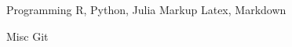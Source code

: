 

\begin{cvskills}

  \cvskill
    {Programming} %
    {R, Python, Julia}{} %
   \cvskill
    {Markup} %
    {Latex, Markdown}{} %
    
   \cvskill
    {Misc} %
    {Git}{} %
    
\end{cvskills}